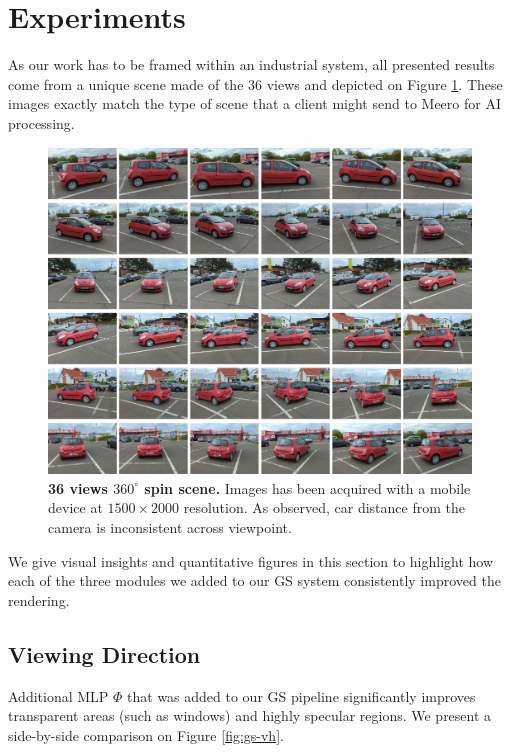 \section{Experiments}
\label{sec:exp-gs}

As our work has to be framed within an industrial system, all presented results come from a unique scene made of the 36 views and depicted on Figure \ref{fig:all_views}. These images exactly match the type of scene that a client might send to Meero for \ac{AI} processing.

\begin{figure}[htpb!]
  \center
\includegraphics[width=.9\linewidth]{images/gaussiansplatting/original_scene.png}
\caption{\textbf{36 views $360^{\circ}$ spin scene.} Images has been acquired with a mobile device at $1500\times 2000$ resolution. As observed, car distance from the camera is inconsistent across viewpoint.}
\label{fig:all_views}
\end{figure}

We give visual insights and quantitative figures in this section to highlight how each of the three modules we added to our \ac{GS} system consistently improved the rendering. 

\subsection{Viewing Direction}

Additional \ac{MLP} $\Phi$ that was added to our \ac{GS} pipeline significantly improves transparent areas (such as windows) and highly specular regions. We present a side-by-side comparison on Figure \ref{fig:gs-vh}. 

